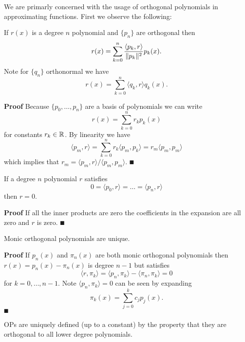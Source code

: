 We are primarly concerned with the usage of orthogonal polynomials in approximating functions. First we observe the following:

\begin{proposition}[expansion] If $r(x)$ is a degree $n$ polynomial and $\{p_n\}$ are orthogonal then
\[
r(x) = \ensuremath{\sum}_{k=0}^n {\ensuremath{\langle}p_k,r\ensuremath{\rangle} \over \|p_k\|^2} p_k(x).
\]
Note for $\{q_n\}$ orthonormal we have
\[
r(x) = \ensuremath{\sum}_{k=0}^n \ensuremath{\langle}q_k,r\ensuremath{\rangle} q_k(x).
\]
\end{proposition}
\textbf{Proof} Because $\{p_0,\ensuremath{\ldots},p_n \}$ are a basis of polynomials we can write
\[
r(x) = \ensuremath{\sum}_{k=0}^n r_k p_k(x)
\]
for constants $r_k \in {\mathbb R}$. By linearity we have
\[
\ensuremath{\langle}p_m,r\ensuremath{\rangle} = \ensuremath{\sum}_{k=0}^n r_k \ensuremath{\langle}p_m,p_k\ensuremath{\rangle}= r_m \ensuremath{\langle}p_m,p_m\ensuremath{\rangle}
\]
which implies that $r_m = \ensuremath{\langle}p_m,r\ensuremath{\rangle}/\ensuremath{\langle}p_m,p_m\ensuremath{\rangle}$. \ensuremath{\QED}

\begin{corollary} If a degree $n$ polynomial $r$ satisfies
\[
0 = \ensuremath{\langle}p_0,r\ensuremath{\rangle} = \ensuremath{\ldots} = \ensuremath{\langle}p_n,r\ensuremath{\rangle}
\]
then $r = 0$.

\end{corollary}
\textbf{Proof} If all the inner products are zero the coefficients in the expansion are all zero and $r$ is zero. \ensuremath{\QED}

\begin{corollary}[uniqueness] Monic orthogonal polynomials are unique.

\end{corollary}
\textbf{Proof} If $p_n(x)$ and $\ensuremath{\pi}_n(x)$ are both monic orthogonal polynomials then $r(x) = p_n(x) - \ensuremath{\pi}_n(x)$ is degree $n-1$ but satisfies
\[
\ensuremath{\langle}r, \ensuremath{\pi}_k\ensuremath{\rangle} = \ensuremath{\langle}p_n, \ensuremath{\pi}_k\ensuremath{\rangle} - \ensuremath{\langle}\ensuremath{\pi}_n, \ensuremath{\pi}_k\ensuremath{\rangle} = 0
\]
for $k = 0,\ensuremath{\ldots},{n-1}$. Note $\ensuremath{\langle}p_n, \ensuremath{\pi}_k\ensuremath{\rangle} = 0$ can be seen by expanding
\[
\ensuremath{\pi}_k(x) = \ensuremath{\sum}_{j=0}^k c_j p_j(x).
\]
\ensuremath{\QED}

OPs are uniquely defined (up to a constant) by the property that they are orthogonal to all lower degree polynomials.

